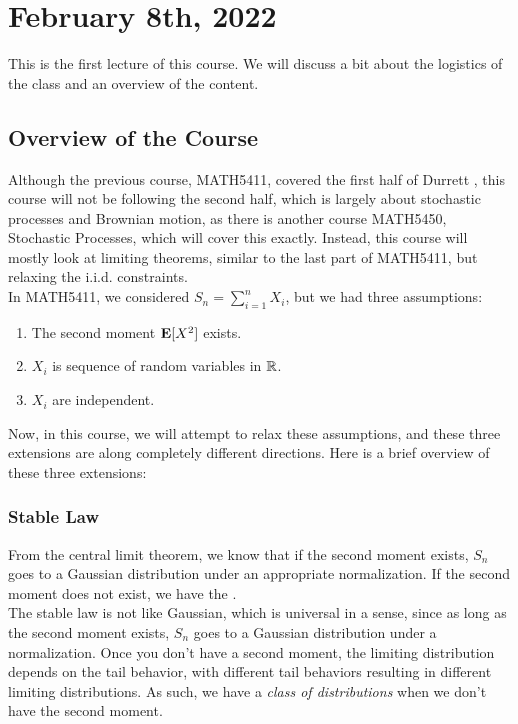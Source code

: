 \documentclass[../main/main.tex]{subfiles}
\begin{document}
\section{February 8th, 2022}

This is the first lecture of this course. We will discuss a bit about the logistics of the class and an overview of the content.

\subsection{Overview of the Course}

Although the previous course, MATH5411, covered the first half of Durrett \cite{Dur19}, this course will not be following the second half, which is largely about stochastic processes and Brownian motion, as there is another course MATH5450, Stochastic Processes, which will cover this exactly. Instead, this course will mostly look at limiting theorems, similar to the last part of MATH5411, but relaxing the i.i.d. constraints.\\

In MATH5411, we considered $S_n = \sum\limits_{i=1}^{n} X_i$, but we had three assumptions:
\begin{enumerate}
	\item The second moment $\text{\textbf{E}}[X^2]$ exists.
	\item $X_i$ is sequence of random variables in $\mathbb{R}$.
	\item $X_i$ are independent.
\end{enumerate}

Now, in this course, we will attempt to relax these assumptions, and these three extensions are along completely different directions. Here is a brief overview of these three extensions:

\subsubsection{Stable Law}

From the central limit theorem, we know that if the second moment exists, $S_n$  goes to a Gaussian distribution under an appropriate normalization. If the second moment does not exist, we have the .\\

The stable law is not like Gaussian, which is universal in a sense, since as long as the second moment exists, $S_n$ goes to a Gaussian distribution under a normalization. Once you don't have a second moment, the limiting distribution depends on the tail behavior, with different tail behaviors resulting in different limiting distributions. As such, we have a \textit{class of distributions} when we don't have the second moment.\\
\end{document}

